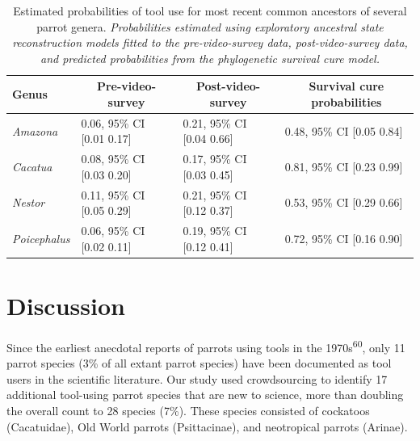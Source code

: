 \documentclass[
  man,floatsintext]{apa6}
\begin{document}
\begin{table}[tbp]

\begin{center}
\begin{threeparttable}

\caption{\label{tab:tableASR}Estimated probabilities of tool use for most recent common ancestors of several parrot genera. \emph{Probabilities estimated using exploratory ancestral state reconstruction models fitted to the pre-video-survey data, post-video-survey data, and predicted probabilities from the phylogenetic survival cure model.}}

\begin{tabular}{llll}
\toprule
Genus & \multicolumn{1}{c}{Pre-video-survey} & \multicolumn{1}{c}{Post-video-survey} & \multicolumn{1}{c}{Survival cure probabilities}\\
\midrule
\textit{Amazona} & 0.06, 95\% CI [0.01 0.17] & 0.21, 95\% CI [0.04 0.66] & 0.48, 95\% CI [0.05 0.84]\\
\textit{Cacatua} & 0.08, 95\% CI [0.03 0.20] & 0.17, 95\% CI [0.03 0.45] & 0.81, 95\% CI [0.23 0.99]\\
\textit{Nestor} & 0.11, 95\% CI [0.05 0.29] & 0.21, 95\% CI [0.12 0.37] & 0.53, 95\% CI [0.29 0.66]\\
\textit{Poicephalus} & 0.06, 95\% CI [0.02 0.11] & 0.19, 95\% CI [0.12 0.41] & 0.72, 95\% CI [0.16 0.90]\\
\bottomrule
\end{tabular}

\end{threeparttable}
\end{center}

\end{table}

\hypertarget{discussion}{%
\section{Discussion}\label{discussion}}

Since the earliest anecdotal reports of parrots using tools in the 1970s\textsuperscript{60}, only 11 parrot species (3\% of all extant parrot species) have been documented as tool users in the scientific literature. Our study used crowdsourcing to identify 17 additional tool-using parrot species that are new to science, more than doubling the overall count to 28 species (7\%). These species consisted of cockatoos (Cacatuidae), Old World parrots (Psittacinae), and neotropical parrots (Arinae).
\end{document}
